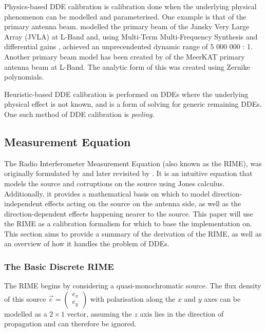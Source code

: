 \documentclass{article}
\begin{document}
Physics-based DDE calibration is calibration done when the underlying physical phenomenon can be modelled and parameterised. One example is that of the primary antenna beam. \cite{mitra2015} modelled the primary beam of the Jansky Very Large Array (JVLA) at L-Band and, using Multi-Term Multi-Frequency Synthesis \citep{rau2011multi} and differential gains \citep{smirnov2011ddewsrt}, achieved an unprecendented dynamic range of 5 000 000 : 1. Another primary beam model has been created by \cite{khaneidos} of the MeerKAT primary antenna beam at L-Band. The analytic form of this was created using Zernike polynomials.

Heuristic-based DDE calibration is performed on DDEs where the underlying physical effect is not known, and is a form of solving for generic remaining DDEs. One such method of DDE calibration is \textit{peeling}\citep{noordam2004peeling}. 

\subsection{Measurement Equation}
The Radio Interferometer Measurement Equation (also known as the RIME), was originally formulated by \cite{hamaker1996} and later revisited by \cite{smirnov2011}. It is an intuitive equation that models the source and corruptions on the source using Jones calculus. Additionally, it provides a mathematical basis on which to model direction-independent effects acting on the source on the antenna side, as well as the direction-dependent effects happening nearer to the source. This paper will use the RIME as a calibration formalism for which to base the implementation on. This section aims to provide a summary of the derivation of the RIME, as well as an overview of how it handles the problem of DDEs.

\subsubsection{The Basic Discrete RIME}
The RIME begins by considering a quasi-monochromatic source. The flux density of this source $\vec{e} =\begin{pmatrix} e_x \\ e_y \end{pmatrix}$ with polarisation along the $x$ and $y$ axes can be modelled as a $2 \times 1$ vector, assuming the $z$ axis lies in the direction of propagation and can therefore be ignored.
\end{document}
